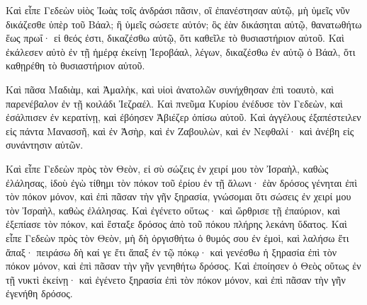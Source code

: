 {Καὶ εἶπε Γεδεὼν υἱὸς Ἰωὰς τοῖς ἀνδράσι πᾶσιν, οἳ ἐπανέστησαν αὐτῷ, μὴ ὑμεῖς νῦν δικάζεσθε ὑπὲρ τοῦ Βάαλ; ἢ ὑμεῖς σώσετε αὐτόν; ὃς ἐὰν δικάσηται αὐτῷ, θανατωθήτω ἕως πρωΐ· εἰ θεός ἐστι, δικαζέσθω αὐτῷ, ὅτι καθεῖλε τὸ θυσιαστήριον αὐτοῦ.
Καὶ ἐκάλεσεν αὐτὸ ἐν τῇ ἡμέρᾳ ἐκείνῃ Ἱεροβάαλ, λέγων, δικαζέσθω ἐν αὐτῷ ὁ Βάαλ, ὅτι καθῃρέθη τὸ θυσιαστήριον αὐτοῦ.
\par }{\PP {}Καὶ πᾶσα Μαδιὰμ, καὶ Ἀμαλὴκ, καὶ υἱοὶ ἀνατολῶν συνήχθησαν ἐπὶ τοαυτὸ, καὶ παρενέβαλον ἐν τῇ κοιλάδι Ἰεζραέλ.
Καὶ πνεῦμα Κυρίου ἐνέδυσε τὸν Γεδεὼν, καὶ ἐσάλπισεν ἐν κερατίνῃ, καὶ ἐβόησεν Ἀβιέζερ ὀπίσω αὐτοῦ.
Καὶ ἀγγέλους ἐξαπέστειλεν εἰς πάντα Μανασσῆ, καὶ ἐν Ἀσὴρ, καὶ ἐν Ζαβουλὼν, καὶ ἐν Νεφθαλί· καὶ ἀνέβη εἰς συνάντησιν αὐτῶν.
\par }{\PP {}Καὶ εἶπε Γεδεὼν πρὸς τὸν Θεὸν, εἰ σὺ σώζεις ἐν χειρί μου τὸν Ἰσραὴλ, καθὼς ἐλάλησας,
ἰδοὺ ἐγὼ τίθημι τὸν πόκον τοῦ ἐρίου ἐν τῇ ἅλωνι· ἐὰν δρόσος γένηται ἐπὶ τὸν πόκον μόνον, καὶ ἐπὶ πᾶσαν τὴν γῆν ξηρασία, γνώσομαι ὅτι σώσεις ἐν χειρί μου τὸν Ἰσραὴλ, καθὼς ἐλάλησας.
Καὶ ἐγένετο οὕτως· καὶ ὤρθρισε τῇ ἐπαύριον, καὶ ἐξεπίασε τὸν πόκον, καὶ ἔσταξε δρόσος ἀπὸ τοῦ πόκου πλήρης λεκάνη ὕδατος.
Καὶ εἶπε Γεδεὼν πρὸς τὸν Θεὸν, μὴ δὴ ὀργισθήτω ὁ θυμός σου ἐν ἐμοὶ, καὶ λαλήσω ἔτι ἅπαξ· πειράσω δὴ καί γε ἔτι ἅπαξ ἐν τῷ πόκῳ· καὶ γενέσθω ἡ ξηρασία ἐπὶ τὸν πόκον μόνον, καὶ ἐπὶ πᾶσαν τὴν γῆν γενηθήτω δρόσος.
Καὶ ἐποίησεν ὁ Θεὸς οὕτως ἐν τῇ νυκτὶ ἐκείνῃ· καὶ ἐγένετο ξηρασία ἐπὶ τὸν πόκον μόνον, καὶ ἐπὶ πᾶσαν τὴν γῆν ἐγενήθη δρόσος.

}
